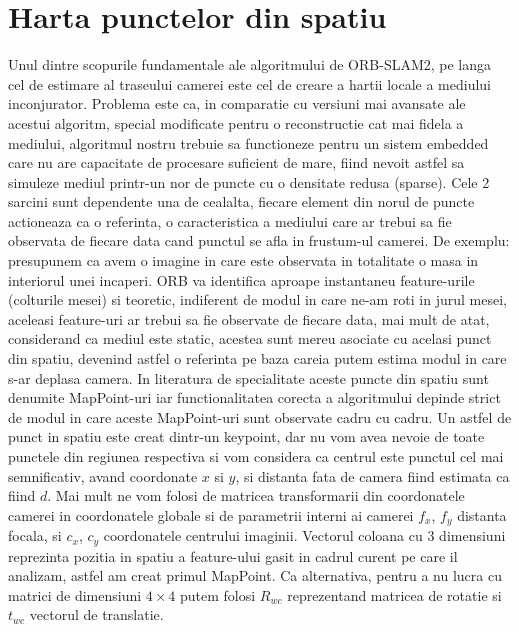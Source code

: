 \documentclass[12pt,a4paper]{report}
\begin{document}
\section{Harta punctelor din spatiu}
Unul dintre scopurile fundamentale ale algoritmului de ORB-SLAM2, pe langa cel 
de estimare al traseului camerei este cel de creare a hartii locale a mediului
inconjurator. Problema este ca, in comparatie cu versiuni mai avansate ale
acestui algoritm, special modificate pentru o reconstructie cat mai fidela a mediului,
algoritmul nostru trebuie sa functioneze pentru un sistem embedded care nu are 
capacitate de procesare suficient de mare, fiind nevoit astfel sa simuleze mediul 
printr-un nor de puncte cu o densitate redusa (sparse). Cele 2 sarcini sunt 
dependente una de cealalta, fiecare element din norul de puncte actioneaza ca
o referinta, o caracteristica a mediului care ar trebui sa fie observata de fiecare 
data cand punctul se afla in frustum-ul camerei. De exemplu: presupunem ca avem
o imagine in care este observata in totalitate o masa in interiorul unei incaperi. 
ORB va identifica aproape instantaneu feature-urile (colturile mesei) si teoretic,
indiferent de modul in care ne-am roti in jurul mesei, aceleasi feature-uri
ar trebui sa fie observate de fiecare data, mai mult de atat, considerand ca mediul 
este static, acestea sunt mereu asociate cu acelasi punct din spatiu, devenind astfel 
o referinta pe baza careia putem estima modul in care s-ar deplasa camera. 
In literatura de specialitate aceste puncte din spatiu sunt  denumite MapPoint-uri 
iar functionalitatea corecta a algoritmului depinde strict de 
modul in care aceste MapPoint-uri sunt observate cadru cu cadru. Un astfel de punct 
in spatiu este creat dintr-un keypoint, dar nu vom avea nevoie de toate punctele din 
regiunea respectiva si vom considera ca centrul este punctul cel mai semnificativ,  
avand coordonate \(x\) si \(y\), si distanta fata de camera fiind estimata ca fiind 
\(d\). Mai mult ne vom folosi de matricea transformarii din coordonatele camerei
in coordonatele globale si de parametrii interni ai camerei \(f_x\), \(f_y\) 
distanta focala, si \(c_x\), \(c_y\) coordonatele centrului imaginii.
Vectorul coloana cu 3 dimensiuni reprezinta pozitia in spatiu a feature-ului gasit
in cadrul curent pe care il analizam, astfel am creat primul MapPoint. Ca alternativa,
pentru a nu lucra cu matrici de dimensiuni $ 4 \times 4 $ putem folosi \(R_{wc}\) reprezentand
matricea de rotatie si \(t_{wc}\) vectorul de translatie.
\end{document}
